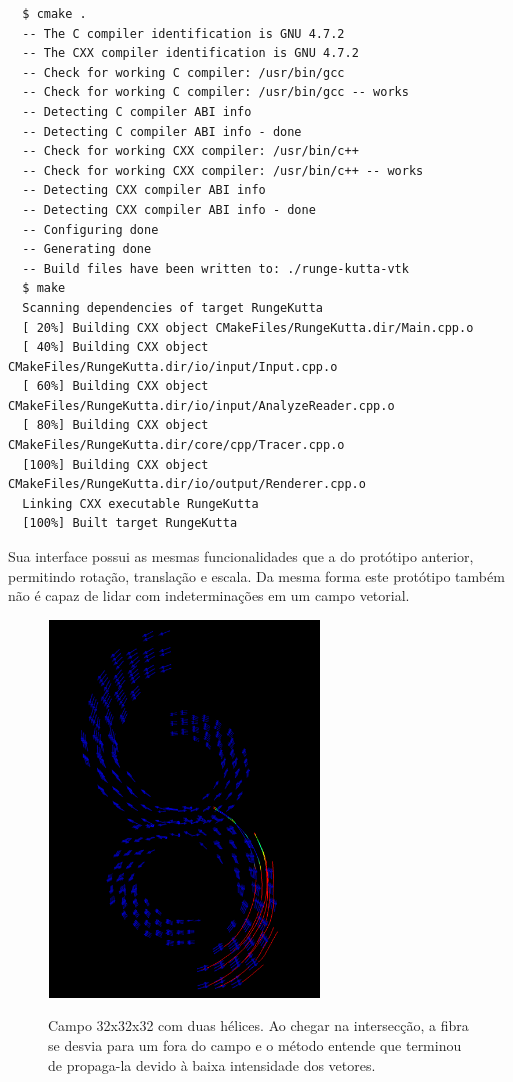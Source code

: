   {\scriptsize
  \begin{verbatim}
  $ cmake .
  -- The C compiler identification is GNU 4.7.2
  -- The CXX compiler identification is GNU 4.7.2
  -- Check for working C compiler: /usr/bin/gcc
  -- Check for working C compiler: /usr/bin/gcc -- works
  -- Detecting C compiler ABI info
  -- Detecting C compiler ABI info - done
  -- Check for working CXX compiler: /usr/bin/c++
  -- Check for working CXX compiler: /usr/bin/c++ -- works
  -- Detecting CXX compiler ABI info
  -- Detecting CXX compiler ABI info - done
  -- Configuring done
  -- Generating done
  -- Build files have been written to: ./runge-kutta-vtk
  $ make
  Scanning dependencies of target RungeKutta
  [ 20%] Building CXX object CMakeFiles/RungeKutta.dir/Main.cpp.o
  [ 40%] Building CXX object CMakeFiles/RungeKutta.dir/io/input/Input.cpp.o
  [ 60%] Building CXX object CMakeFiles/RungeKutta.dir/io/input/AnalyzeReader.cpp.o
  [ 80%] Building CXX object CMakeFiles/RungeKutta.dir/core/cpp/Tracer.cpp.o
  [100%] Building CXX object CMakeFiles/RungeKutta.dir/io/output/Renderer.cpp.o
  Linking CXX executable RungeKutta
  [100%] Built target RungeKutta
  \end{verbatim}
  }
  
  Sua interface possui as mesmas funcionalidades que a do protótipo anterior, permitindo rotação, translação e escala. Da mesma forma este protótipo também não é capaz de lidar com indeterminações em um campo vetorial.
  
  \begin{figure}[!h]
    \begin{center}
      \includegraphics[width=72mm, height=100mm]{images/fibraecampo-vtk.png}
      \label{fig:fibraecampo-vtk}
      \caption{Campo 32x32x32 com duas hélices. Ao chegar na intersecção, a fibra se desvia para um fora do campo e o método entende que terminou de propaga-la devido à baixa intensidade dos vetores.}
    \end{center}
  \end{figure}
